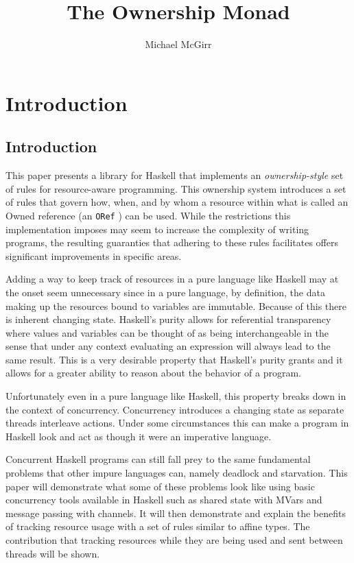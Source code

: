 \documentclass[onehalf,11pt]{beavtex}
\title{The Ownership Monad}
\author{Michael McGirr}
\begin{document}
\maketitle

\mainmatter

\chapter{Introduction}
\section{Introduction}

This paper presents a library for Haskell that implements an \textit{ownership-style}
set of rules for resource-aware programming. This ownership system introduces a
set of rules that govern how, when, and by whom a resource within what is called
an Owned reference (an \texttt{ORef} ) can be used. While the restrictions this
implementation imposes may seem to increase the complexity of writing programs,
the resulting guaranties that adhering to these rules facilitates offers
significant improvements in specific areas. %

Adding a way to keep track of resources in a pure language like Haskell may
at the onset seem unnecessary since in a pure language, by definition, %
the data making up the resources bound to variables are immutable. Because of
this there is inherent changing state.  Haskell's purity allows for referential
transparency where values and variables can be thought of as being
interchangeable in the sense that under any context evaluating an expression will
always lead to the same result.  This is a very desirable property that
Haskell's purity grants and it allows for a greater ability to reason about the
behavior of a program.

Unfortunately even in a pure language like Haskell, this property breaks down in
the context of concurrency.  Concurrency introduces a changing state as separate
threads interleave actions.  Under some circumstances this can make a program
in Haskell look and act as though it were an imperative language.

Concurrent Haskell programs can still fall prey to the same fundamental
problems that other impure languages can, namely deadlock and starvation.
This paper will demonstrate what some of these problems look like using
basic concurrency tools available in Haskell such as shared state with
MVars and message passing with channels.
It will then demonstrate and explain the benefits of tracking resource usage
with a set of rules similar to affine types. The contribution that
tracking resources while they are being used and sent between threads
will be shown. %
\end{document}
